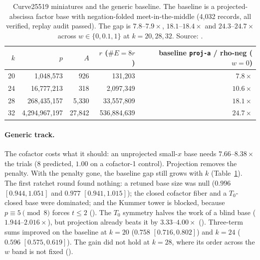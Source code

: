 \begin{table}[t]
\centering\small
\begin{tabular}{@{}rrrrr@{}}
\toprule
$k$ & $p$ & $A$ & $r$ ($\#E=8r$) & baseline \texttt{proj-a} / rho-neg ($w=0$) \\
\midrule
20 & 1{,}048{,}573 & 926 & 131{,}203 & $7.8\times$ \\
24 & 16{,}777{,}213 & 318 & 2{,}097{,}349 & $10.6\times$ \\
28 & 268{,}435{,}157 & 5{,}330 & 33{,}557{,}809 & $18.1\times$ \\
32 & 4{,}294{,}967{,}197 & 27{,}842 & 536{,}884{,}639 & $24.7\times$ \\
\bottomrule
\end{tabular}
\caption[]{Curve25519 miniatures and the generic baseline. The baseline is a
projected-abscissa factor base with negation-folded meet-in-the-middle
(4{,}032 records, all verified, replay audit passed). The gap is
$7.8$--$7.9\times$, $18.1$--$18.4\times$ and $24.3$--$24.7\times$ across
$w\in\{0,0.1,1\}$ at $k=20,28,32$. Source:
.}
\label{tab:c25519}
\end{table}

\paragraph{Generic track.} The cofactor costs what it should: an
unprojected small-$x$ base needs $7.66$--$8.38\times$ the trials (8
predicted, $1.00$ on a cofactor-1 control). Projection removes the
penalty. With the penalty gone, the baseline gap still grows with $k$
(Table~\ref{tab:c25519}). The first ratchet round found nothing: a retuned
base size was null ($0.996$ $[0.944,1.051]$ and $0.977$ $[0.941,1.015]$);
the closed cofactor fiber and a $T_0$-closed base were dominated; and the
Kummer tower is blocked, because $p\equiv5\pmod8$ forces $t\le2$
(). The $T_0$ symmetry halves
the work of a blind base ($1.944$--$2.016\times$), but projection already
beats it by $3.33$--$4.00\times$
(). Three-term sums
improved on the baseline at $k=20$ ($0.758$ $[0.716,0.802]$) and $k=24$
($0.596$ $[0.575,0.619]$). The gain did not hold at $k=28$, where its order
across the $w$ band is not fixed ().

